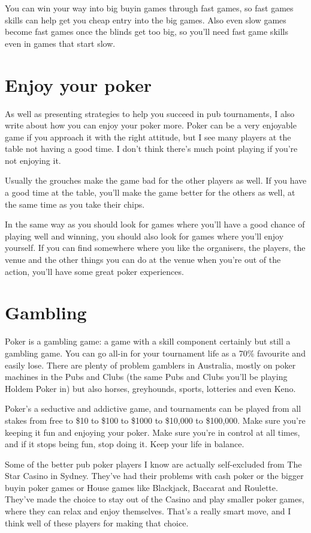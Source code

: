 You can win your way into big buyin games through fast games,
so fast games skills can help get you cheap entry into the big games.
Also even slow games become fast games once the blinds get too big,
so you'll need fast game skills even in games that start slow.

\section*{Enjoy your poker}

As well as presenting strategies to help you succeed
in pub tournaments,
I also write about how you can enjoy your poker
more. Poker can be a very enjoyable game if you approach
it with the right attitude, but I see many players at the table
not having a good time. I don't think there's much
point playing if you're not enjoying it.

Usually the grouches make the game bad for the other
players as well. If you have a good time at the table, you'll make the
game better for the others as well, at the same time as you take
their chips.

In the same way as you should look for games where you'll have
a good chance of playing well and winning, you should
also look for games where you'll enjoy yourself.
If you can find somewhere where you like
the organisers, the players, the venue and the other things
you can do at the venue when you're out of the action,
you'll have some great poker experiences.

\section*{Gambling}

Poker is a gambling
game: a game with a skill component certainly but still
a gambling game. You can go all-in for your tournament life
as a 70\% favourite and easily lose. There are plenty of problem gamblers
in Australia, mostly on poker machines in the Pubs and Clubs
(the same Pubs and Clubs you'll be playing Holdem Poker
in) but also horses, greyhounds, sports, lotteries and even Keno.

Poker's a seductive and addictive game,
and tournaments can be played from all stakes from free to \$10 to \$100
to \$1000 to \$10,000 to \$100,000. Make sure you're keeping it fun
and enjoying your poker. Make sure you're in control at all times,
and if it stops being fun, stop doing it. Keep your life in balance.

Some of the better pub poker players I know are actually
self-excluded from The Star Casino in Sydney. They've had
their problems with cash poker or the bigger buyin poker games or
House games like Blackjack, Baccarat and Roulette. They've
made the choice to stay out of the Casino and play smaller poker games,
where they can relax and enjoy themselves. That's a really smart
move, and I think well of these players for making that choice.

